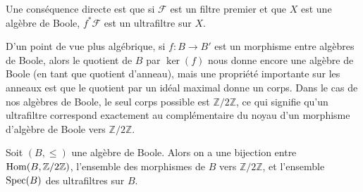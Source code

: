Une conséquence directe est que si $\mathcal F$ est un filtre premier et que $X$
est une algèbre de Boole, $f^*\mathcal F$ est un ultrafiltre sur $X$.

D'un point de vue plus algébrique, si $f : B \to B'$ est un morphisme entre
algèbres de Boole, alors le quotient de $B$ par $\ker(f)$ nous donne encore une
algèbre de Boole (en tant que quotient d'anneau), mais une propriété importante
sur les anneaux est que le quotient par un idéal maximal donne un corps. Dans le
cas de nos algèbres de Boole, le seul corps possible est $\mathbb Z/2\mathbb Z$,
ce qui signifie qu'un ultrafiltre correspond exactement au complémentaire du
noyau d'un morphisme d'algèbre de Boole vers $\mathbb Z/2\mathbb Z$.

\begin{proposition}
  Soit $(B,\leq)$ une algèbre de Boole. Alors on a une bijection entre
  $\operatorname{Hom}(B,\mathbb Z/2\mathbb Z)$, l'ensemble des morphismes de $B$ vers
  $\mathbb Z/2\mathbb Z$, et l'ensemble $\operatorname{Spec}(B)$ des ultrafiltres sur $B$.
\end{proposition}

